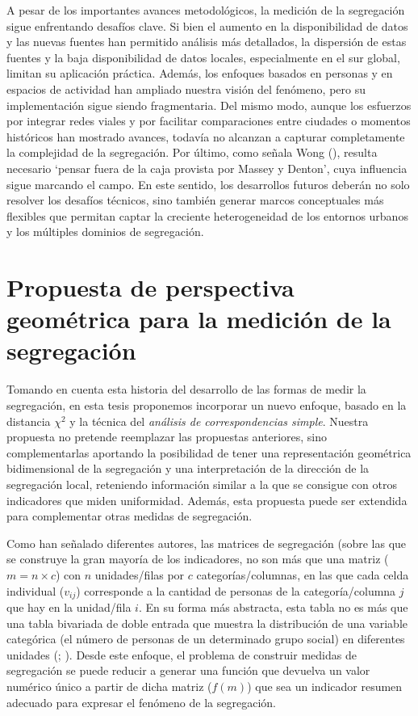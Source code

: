 \documentclass[
  spanish,
  a4paper,%
  chapterprefix=true,%
  DIV=calc,%
  twoside]{scrbook}%
\begin{document}
A pesar de los importantes avances metodológicos, la medición de la
segregación sigue enfrentando desafíos clave. Si bien el aumento en la
disponibilidad de datos y las nuevas fuentes han permitido análisis más
detallados, la dispersión de estas fuentes y la baja disponibilidad de
datos locales, especialmente en el sur global, limitan su aplicación
práctica. Además, los enfoques basados en personas y en espacios de
actividad han ampliado nuestra visión del fenómeno, pero su
implementación sigue siendo fragmentaria. Del mismo modo, aunque los
esfuerzos por integrar redes viales y por facilitar comparaciones entre
ciudades o momentos históricos han mostrado avances, todavía no alcanzan
a capturar completamente la complejidad de la segregación. Por último,
como señala Wong (), resulta necesario `pensar fuera de la
caja provista por Massey y Denton', cuya influencia sigue marcando el
campo. En este sentido, los desarrollos futuros deberán no solo resolver
los desafíos técnicos, sino también generar marcos conceptuales más
flexibles que permitan captar la creciente heterogeneidad de los
entornos urbanos y los múltiples dominios de segregación.

\section{Propuesta de perspectiva geométrica para la medición de la segregación}\label{method-geometric}

Tomando en cuenta esta historia del desarrollo de las formas de medir la
segregación, en esta tesis proponemos incorporar un nuevo enfoque,
basado en la distancia \(\chi^2\) y la técnica del \emph{análisis de
correspondencias simple}. Nuestra propuesta no pretende reemplazar las
propuestas anteriores, sino complementarlas aportando la posibilidad de
tener una representación geométrica bidimensional de la segregación y
una interpretación de la dirección de la segregación local, reteniendo
información similar a la que se consigue con otros indicadores que miden
uniformidad. Además, esta propuesta puede ser extendida para
complementar otras medidas de segregación.

Como han señalado diferentes autores, las matrices de segregación (sobre
las que se construye la gran mayoría de los indicadores, no son más que
una matriz (\(m = n \times c\)) con \(n\) unidades/filas por \(c\)
categorías/columnas, en las que cada celda individual (\(v_{ij}\))
corresponde a la cantidad de personas de la categoría/columna \(j\) que
hay en la unidad/fila \(i\). En su forma más abstracta, esta tabla no es
más que una tabla bivariada de doble entrada que muestra la distribución
de una variable categórica (el número de personas de un determinado
grupo social) en diferentes unidades (; ). Desde
este enfoque, el problema de construir medidas de segregación se puede
reducir a generar una función que devuelva un valor numérico único a
partir de dicha matriz (\(f(m)\)) que sea un indicador resumen adecuado
para expresar el fenómeno de la segregación.
\end{document}
